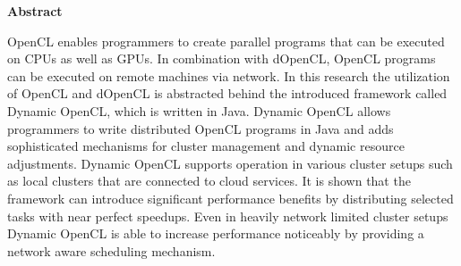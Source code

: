 \begin{center}\textsf{\textbf{Abstract}}\end{center}

\noindent OpenCL enables programmers to create parallel programs that can be executed on CPUs as well as GPUs. In combination with dOpenCL, OpenCL programs can be executed on remote machines via network. In this research the utilization of OpenCL and dOpenCL is abstracted behind the introduced framework called Dynamic OpenCL, which is written in Java. Dynamic OpenCL allows programmers to write distributed OpenCL programs in Java and adds sophisticated mechanisms for cluster management and dynamic resource adjustments. Dynamic OpenCL supports operation in various cluster setups such as local clusters that are connected to cloud services. It is shown that the framework can introduce significant performance benefits by distributing selected tasks with near perfect speedups. Even in heavily network limited cluster setups Dynamic OpenCL is able to increase performance noticeably by providing a network aware scheduling mechanism.



